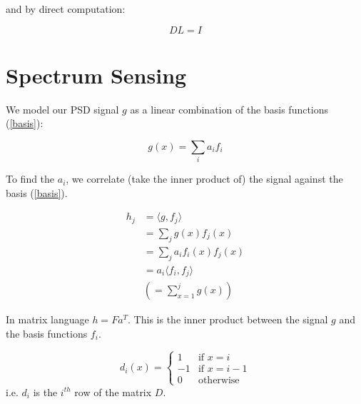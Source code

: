 and by direct computation:

\begin{equation}
DL = I
\label{Dinv}
\end{equation}

\section{Spectrum Sensing}

We model our PSD signal \(g\) as a linear combination of the basis functions (\ref{basis}):

\begin{equation}
g\left(x\right) = \sum_i a_i f_i 
\label{basis-expansion}
\end{equation}

To find the \(a_i\), we correlate (take the inner product of) the signal against the basis (\ref{basis}).

\begin{definition}
\begin{align}
h_j &= \langle g, f_j \rangle \\
&= \sum_j g\left(x\right) f_j\left(x\right) \\
&= \sum_j a_i f_i\left(x\right) f_j\left(x\right) \\
&= a_i \langle f_i, f_j\rangle \\
&\left(= \sum_{x=1}^j g\left(x\right)\right)
\end{align}

In matrix language \(h = F a^T\). This is the inner product between the signal \(g\) and the basis functions \(f_i\).
\end{definition}

\begin{definition}
\begin{equation}
d_i\left(x\right) =
\begin{cases}
1 & \text{if } x = i \\
-1 & \text{if } x = i-1 \\
0 & \text{otherwise} 
\end{cases}
\end{equation}
i.e. \(d_i\) is the \(i^{th}\) row of the matrix \(D\).
\end{definition}


